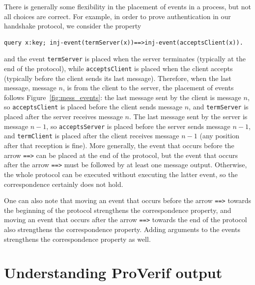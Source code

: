 \documentclass{book}
\begin{document}
%
There is generally some flexibility in the placement of events in a process,
but not all choices are correct.
For example, in order to prove authentication %
in our handshake protocol, we consider the property
\begin{lstlisting}[numbers=none]
query x:key; inj-event(termServer(x))==>inj-event(acceptsClient(x)).
\end{lstlisting}
and the event \lstinline!termServer! is placed when the server terminates (typically at the end of the protocol), while \lstinline!acceptsClient! is placed when the client accepts (typically before the client sends its last message). Therefore, when the last message, message $n$, is from the client to the server, the placement of events follows Figure~\ref{fig:mess_events}: the last message sent by the client is message $n$, so \lstinline!acceptsClient! is placed before the client sends message $n$, and \lstinline!termServer! is placed after the server receives message $n$. The last message sent by the server is message $n-1$, so  \lstinline!acceptsServer! is placed before the server sends message $n-1$, and \lstinline!termClient! is placed after the client receives message $n-1$ (any position after that reception is fine).
%
More generally, the event that occurs before the arrow \lstinline!==>!
can be placed at the end of the protocol, but the event that occurs
after the arrow \lstinline!==>! must be followed by at least one
message output. Otherwise, the whole protocol can be executed without
executing the latter event, so the correspondence certainly does not
hold.

One can also note that moving an event that occurs before the arrow
\lstinline!==>! towards the beginning of the protocol strengthens the
correspondence property, and moving an event that occurs after the
arrow \lstinline!==>! towards the end of the protocol also strengthens
the correspondence property. Adding arguments to the events strengthens
the correspondence property as well.

\section{Understanding ProVerif output}\label{sec:output}
\end{document}
